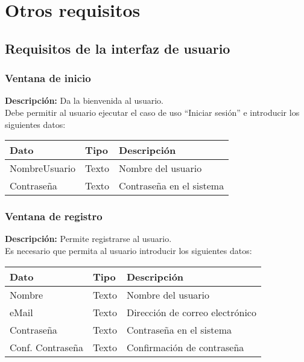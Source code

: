 \section{Otros requisitos}
\subsection{Requisitos de la interfaz de usuario}
\subsubsection{Ventana de inicio}
{\footnotesize

 \textbf{Descripción:} Da la bienvenida al usuario.\\ Debe permitir al usuario
ejecutar el
caso de uso ``Iniciar sesión'' e introducir los siguientes datos: \\

\begin{tabularx}{0.9\textwidth}{llX}
\hline
\textbf{Dato} & \textbf{Tipo} & \textbf{Descripción} \\
\hline
NombreUsuario & Texto & Nombre del usuario \\
Contraseña & Texto & Contraseña en el sistema \\
\hline
\end{tabularx}

\subsubsection{Ventana de registro}
{\footnotesize



 \textbf{Descripción:} Permite registrarse al usuario.\\
Es necesario que
permita al usuario introducir los siguientes datos: \\

\begin{tabularx}{0.9\textwidth}{llX}
\hline
\textbf{Dato} & \textbf{Tipo} & \textbf{Descripción} \\
\hline
Nombre & Texto & Nombre del usuario \\
eMail & Texto & Dirección de correo electrónico \\
Contraseña & Texto & Contraseña en el sistema \\
Conf. Contraseña & Texto & Confirmación de contraseña \\
\hline
\end{tabularx}

}

}
